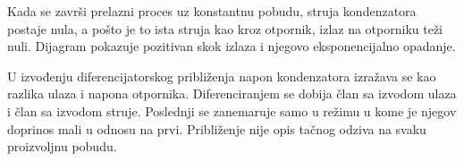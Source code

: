 Kada se završi prelazni proces uz konstantnu pobudu, struja kondenzatora postaje nula, a pošto je to ista struja kao kroz otpornik, izlaz na otporniku teži nuli. Dijagram pokazuje pozitivan skok izlaza i njegovo eksponencijalno opadanje.

U izvođenju diferencijatorskog približenja napon kondenzatora izražava se kao razlika ulaza i napona otpornika. Diferenciranjem se dobija član sa izvodom ulaza i član sa izvodom struje. Poslednji se zanemaruje samo u režimu u kome je njegov doprinos mali u odnosu na prvi. Približenje nije opis tačnog odziva na svaku proizvoljnu pobudu.
